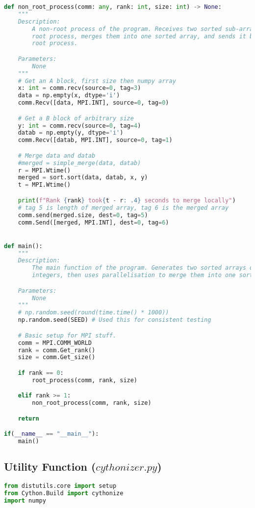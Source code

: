 \documentclass[12pt]{article}
\begin{document}
{\begin{lstlisting}[language={Python}]
def non_root_process(comm: any, rank: int, size: int) -> None:
    """
    Description:
        A non-root process of the program. Receives two sorted sub-arrays from the
        root process, merges them into one sorted array, and sends it back to the
        root process.

    Parameters:
        None
    """
    # Get an A block, first size then numpy array
    x: int = comm.recv(source=0, tag=3)
    data = np.empty(x, dtype='i')
    comm.Recv([data, MPI.INT], source=0, tag=0)

    # Get a B block of arbitrary size
    y: int = comm.recv(source=0, tag=4)
    datab = np.empty(y, dtype='i')
    comm.Recv([datab, MPI.INT], source=0, tag=1)

    # Merge data and datab
    #merged = simple_merge(data, datab)
    r = MPI.Wtime()
    merged = sort.sort(data, datab, x, y)
    t = MPI.Wtime()

    print(f"Rank {rank} took{t - r: .4} seconds to merge locally")
    # tag 5 is length of merged array, tag 6 is the merged array
    comm.send(merged.size, dest=0, tag=5)
    comm.Send([merged, MPI.INT], dest=0, tag=6)


def main():
    """
    Description:
        The main function of the program. Generates two sorted arrays of random
        integers, then uses parallelisation to merge them into one sorted array.

    Parameters:
        None
    """
    # np.random.seed(round(time.time() * 1000))
    np.random.seed(SEED) # Used this for consistent testing

    # Basic setup for MPI stuff.
    comm = MPI.COMM_WORLD
    rank = comm.Get_rank()
    size = comm.Get_size()

    if rank == 0:
        root_process(comm, rank, size)

    elif rank >= 1:
        non_root_process(comm, rank, size)

    return

if(__name__ == "__main__"):
    main()

    \end{lstlisting}
    
\pagebreak

    \subsection{Utility Function ($cythonizer.py$)}
    \begin{lstlisting}[language={Python}]
from distutils.core import setup
from Cython.Build import cythonize
import numpy


\end{lstlisting}}
\end{document}
